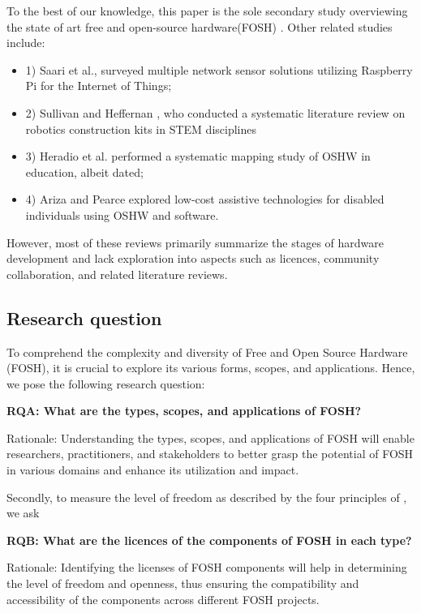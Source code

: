 \documentclass[final-report.tex]{subfiles}
\begin{document}
To the best of our knowledge, this paper is the sole secondary study overviewing the state of art free and open-source hardware(FOSH) . Other related studies include: 
\begin{itemize}
    \renewcommand{\labelitemi}{}
    \item 1) Saari et al.\cite{7973568}, surveyed multiple network sensor solutions utilizing Raspberry Pi for the Internet of Things; 
    \item 2) Sullivan and Heffernan \cite{sullivan2016robotic}, who conducted a systematic literature review on robotics construction kits in STEM disciplines
    \item 3) Heradio et al. \cite{heradio2018open} performed a systematic mapping study of OSHW in education, albeit dated; 
    \item 4) Ariza and Pearce \cite{ariza2022low} explored low-cost assistive technologies for disabled individuals using OSHW and software.
\end{itemize}
 However, most of these reviews primarily summarize the stages of hardware development and lack exploration into aspects such as licences, community collaboration, and related literature reviews.
 
\subsection{Research question}

To comprehend the complexity and diversity of Free and Open Source Hardware (FOSH), it is crucial to explore its various forms, scopes, and applications. Hence, we pose the following research question:

    \textbf{RQA: What are the types, scopes, and applications of FOSH?}
    
Rationale: Understanding the types, scopes, and applications of FOSH will enable researchers, practitioners, and stakeholders to better grasp the potential of FOSH in various domains and enhance its utilization and impact.

    \label{RQA}
    
Secondly, to measure the level of freedom as described by the four principles of \cite{b0_stallman}, we ask

    \textbf{RQB: What are the licences of the components of FOSH in each type?}
    
Rationale: Identifying the licenses of FOSH components will help in determining the level of freedom and openness, thus ensuring the compatibility and accessibility of the components across different FOSH projects.
\end{document}
